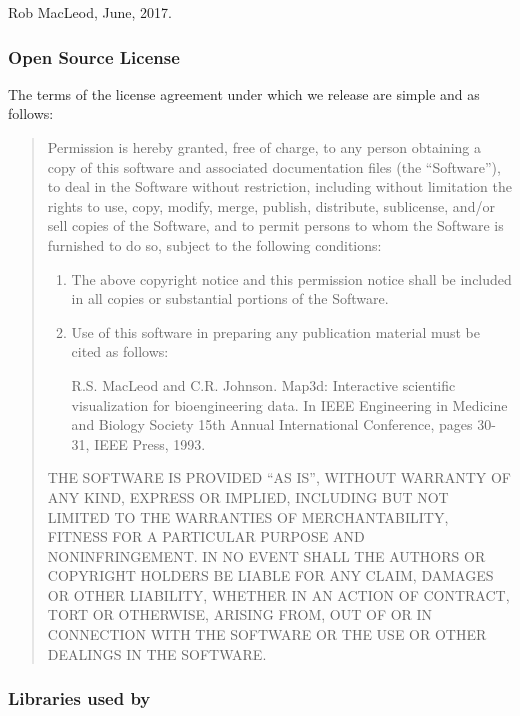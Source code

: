 \bigskip
\noindent
Rob MacLeod, June, 2017.


\subsubsection{Open Source License}
\label{sec:source_license}

The terms of the license agreement under which we release \map{} are simple
and as follows:

\begin{quotation}

Permission is hereby granted, free of charge, to any person obtaining a
copy of this software and associated documentation files (the
``Software''), to deal in the Software without restriction, including
without limitation the rights to use, copy, modify, merge, publish,
distribute, sublicense, and/or sell copies of the Software, and to permit
persons to whom the Software is furnished to do so, subject to the
following conditions:
\begin{enumerate}
  \item The above copyright notice and this permission notice shall be
    included in all copies or substantial portions of the Software.
  \item Use of this software in preparing any publication material must be
    cited as follows:
    
    \vspace{0.1in}
    
    R.S. MacLeod and C.R. Johnson. Map3d: Interactive scientific
    visualization for bioengineering data. In IEEE Engineering in
    Medicine and Biology Society 15th Annual International Conference,
    pages 30-31, IEEE Press, 1993.
\end{enumerate}
\vspace{0.1in}

THE SOFTWARE IS PROVIDED ``AS IS'', WITHOUT WARRANTY OF ANY KIND, EXPRESS
OR IMPLIED, INCLUDING BUT NOT LIMITED TO THE WARRANTIES OF MERCHANTABILITY,
FITNESS FOR A PARTICULAR PURPOSE AND NONINFRINGEMENT. IN NO EVENT SHALL THE
AUTHORS OR COPYRIGHT HOLDERS BE LIABLE FOR ANY CLAIM, DAMAGES OR OTHER
LIABILITY, WHETHER IN AN ACTION OF CONTRACT, TORT OR OTHERWISE, ARISING
FROM, OUT OF OR IN CONNECTION WITH THE SOFTWARE OR THE USE OR OTHER
DEALINGS IN THE SOFTWARE.
\end{quotation}


\subsubsection{Libraries used by \map{}}

